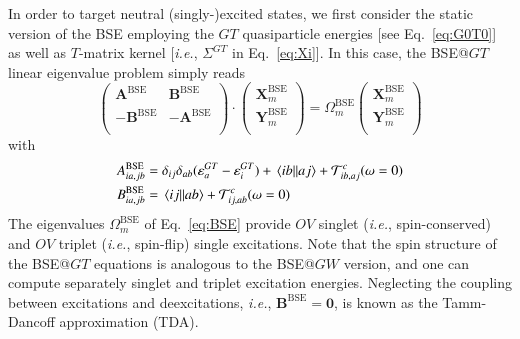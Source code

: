 \documentclass[aip,jcp,reprint,noshowkeys,superscriptaddress]{revtex4-1}
\newcommand{\ie}{\textit{i.e.}}
\newcommand{\Nocc}{O}
\newcommand{\Nvir}{V}
\newcommand{\BSE}{\text{BSE}}
\newcommand{\GT}{GT}
\newcommand{\e}[2]{\eps_{#1}^{#2}}
\newcommand{\Om}[2]{\Omega_{#1}^{#2}}
\newcommand{\bO}{\mathbf{0}}
\newcommand{\bA}[2]{\mathbf{A}_{#1}^{#2}}
\newcommand{\bB}[2]{\mathbf{B}_{#1}^{#2}}
\newcommand{\bX}[2]{\mathbf{X}_{#1}^{#2}}
\newcommand{\bY}[2]{\mathbf{Y}_{#1}^{#2}}
\newcommand{\eps}{\varepsilon}
\newcommand{\cT}{\mathcal{T}}
\begin{document}
In order to target neutral (singly-)excited states, we first consider the static version of the BSE employing the $GT$ quasiparticle energies [see Eq.~\eqref{eq:G0T0}] as well as $T$-matrix kernel [\ie, $\Sigma^{\GT}$ in Eq.~\eqref{eq:Xi}].
In this case, the BSE@$GT$ linear eigenvalue problem simply reads
\begin{equation}
\label{eq:BSE}
	\begin{pmatrix}
		\bA{}{\BSE}		&	\bB{}{\BSE}	\\
		-\bB{}{\BSE}	&	-\bA{}{\BSE}	\\
	\end{pmatrix}
	\cdot
	\begin{pmatrix}
		\bX{m}{\BSE}	\\
		\bY{m}{\BSE}	\\
	\end{pmatrix}
	=
	\Om{m}{\BSE}
	\begin{pmatrix}
		\bX{m}{\BSE}	\\
		\bY{m}{\BSE}	\\
	\end{pmatrix}
\end{equation}
with 
\begin{subequations}
\begin{align}
	A_{ia,jb}^{\BSE} & = \delta_{ij} \delta_{ab} (\e{a}{\GT} - \e{i}{\GT}) + \mel{ib}{}{aj} + \cT^c_{ib,aj}(\omega=0)
	\\ 
	B_{ia,jb}^{\BSE} & = \mel{ij}{}{ab} + \cT^c_{ij,ab}(\omega=0)
\end{align}
\end{subequations}
The eigenvalues $\Om{m}{\BSE}$ of Eq.~\eqref{eq:BSE} provide $\Nocc\Nvir$ singlet (\ie, spin-conserved) and $\Nocc\Nvir$ triplet  (\ie, spin-flip) single excitations.
Note that the spin structure of the BSE@$GT$ equations is analogous to the BSE@$GW$ version, \cite{Monino_2021} and one can compute separately singlet and triplet excitation energies.
Neglecting the coupling between excitations and deexcitations, \ie, $\bB{}{\BSE} = \bO$, is known as the Tamm-Dancoff approximation (TDA).
\end{document}
